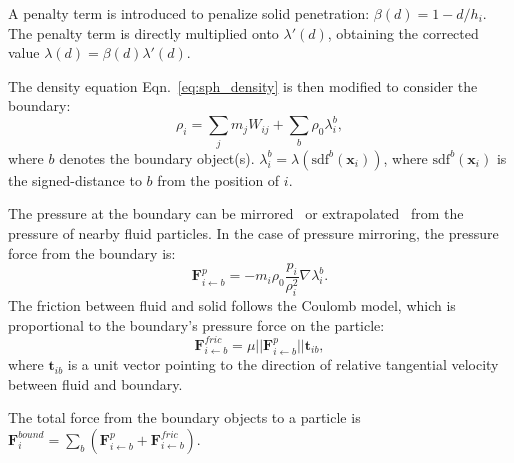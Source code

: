 \documentclass[VANCOUVER,STIX1COL]{WileyNJD-v2}
\providecommand{\DIFadd}[1]{{\protect\color{blue}\uwave{#1}}} %
\providecommand{\DIFaddbegin}{} %
\providecommand{\DIFaddend}{} %
\begin{document}
A penalty term is introduced to penalize solid penetration: $\beta(d) = 1 - d / h_i$. The penalty term is directly multiplied onto $\lambda'(d)$, obtaining the corrected value $\lambda(d) = \beta(d) \lambda'(d)$.


The density equation Eqn.~\ref{eq:sph_density} is then modified to consider the boundary:
\begin{equation}
    \rho_i = \sum_j m_j W_{ij} + \sum_b \rho_0 \lambda_i^b,
\end{equation}
where $b$ denotes the boundary object(s). $\lambda_i^b = \lambda(\mathrm{sdf}^b(\mathbf{x}_i))$, where $\mathrm{sdf}^b(\mathbf{x}_i)$ is the signed-distance to $b$ from the position of $i$.

The pressure at the boundary can be mirrored~\cite{Akinci12} or extrapolated~\cite{Band18b} from the pressure of nearby fluid particles. In the case of pressure mirroring, the pressure force from the boundary is:
\begin{equation}
    \mathbf{F}_{i \leftarrow b}^p = -m_i \rho_0 \frac{p_i}{\rho_i^2} \nabla\lambda_i^b.
    \label{eq:bound_p}
\end{equation}
The friction between \DIFaddbegin \DIFadd{the }\DIFaddend fluid and solid follows the Coulomb model, which is proportional to the boundary's pressure force on the particle:
\begin{equation}
    \mathbf{F}_{i\leftarrow b}^{fric} = \mu ||\mathbf{F}_{i\leftarrow b}^p|| \mathbf{t}_{ib},
    \label{eq:bound_fric}
\end{equation}
where $\mathbf{t}_{ib}$ is a unit vector pointing to the direction of relative tangential velocity between fluid and boundary.

The total force from the boundary objects to a particle is $\mathbf{F}_i^{bound} = \sum_b (\mathbf{F}_{i \leftarrow b}^p + \mathbf{F}_{i\leftarrow b}^{fric})$.

\vspace{-0.5\baselineskip}
\end{document}
